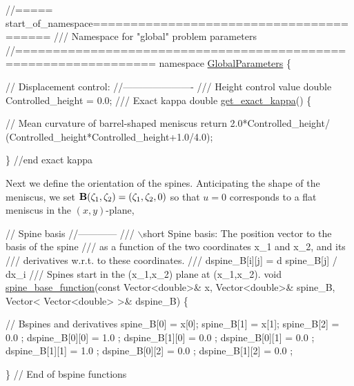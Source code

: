  
\begin{DoxyCodeInclude}
\textcolor{comment}{//===== start\_of\_namespace========================================}
\textcolor{comment}{/// Namespace for "global" problem parameters}
\textcolor{comment}{}\textcolor{comment}{//================================================================}
\textcolor{keyword}{namespace }\hyperlink{namespaceGlobalParameters}{GlobalParameters}
\{

 \textcolor{comment}{// Displacement control:}
 \textcolor{comment}{//----------------------}
\textcolor{comment}{}
\textcolor{comment}{ /// Height control value}
\textcolor{comment}{} \textcolor{keywordtype}{double} Controlled\_height = 0.0;
\textcolor{comment}{}
\textcolor{comment}{ /// Exact kappa }
\textcolor{comment}{} \textcolor{keywordtype}{double} \hyperlink{namespaceGlobalParameters_a4571d41514b16946dd31d075d44c5593}{get\_exact\_kappa}()
 \{ 

  \textcolor{comment}{// Mean curvature of barrel-shaped meniscus}
  \textcolor{keywordflow}{return} 2.0*Controlled\_height/
   (Controlled\_height*Controlled\_height+1.0/4.0);

 \} \textcolor{comment}{//end exact kappa}

\end{DoxyCodeInclude}


Next we define the orientation of the spines. Anticipating the shape of the meniscus, we set $ {\bf B}(\zeta_1,\zeta_2)= (\zeta_1,\zeta_2,0) $ so that $ u=0 $ corresponds to a flat meniscus in the $ (x,y) $-\/plane,


\begin{DoxyCodeInclude}


 \textcolor{comment}{// Spine basis}
 \textcolor{comment}{//------------}
\textcolor{comment}{}
\textcolor{comment}{ /// \(\backslash\)short Spine basis: The position vector to the basis of the spine}
\textcolor{comment}{ /// as a function of the two coordinates x\_1 and x\_2, and its}
\textcolor{comment}{ /// derivatives w.r.t. to these coordinates. }
\textcolor{comment}{ /// dspine\_B[i][j] = d spine\_B[j] / dx\_i}
\textcolor{comment}{ /// Spines start in the (x\_1,x\_2) plane at (x\_1,x\_2).}
\textcolor{comment}{} \textcolor{keywordtype}{void} \hyperlink{namespaceGlobalParameters_ac81daf87f8d3f075d9fd108427e70c4f}{spine\_base\_function}(\textcolor{keyword}{const} Vector<double>& x, 
                          Vector<double>& spine\_B, 
                          Vector< Vector<double> >& dspine\_B)
 \{
  
  \textcolor{comment}{// Bspines and derivatives }
  spine\_B[0]     = x[0];
  spine\_B[1]     = x[1];
  spine\_B[2]     = 0.0 ;
  dspine\_B[0][0] = 1.0 ;
  dspine\_B[1][0] = 0.0 ;
  dspine\_B[0][1] = 0.0 ; 
  dspine\_B[1][1] = 1.0 ;
  dspine\_B[0][2] = 0.0 ;
  dspine\_B[1][2] = 0.0 ;
  
 \} \textcolor{comment}{// End of bspine functions}

\end{DoxyCodeInclude}


